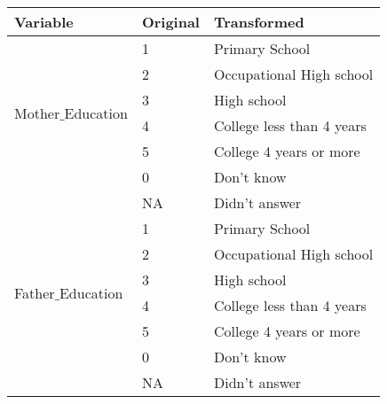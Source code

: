 \begin{table}[H]

	\tiny

	\centering

    \label{table:parents_education_transformation}
    
	\renewcommand{\arraystretch}{1.5}

    \begin{tabular}{l | l | l}
		\hline
        \rowcolor[HTML]{FF9999}		
		
        \textbf{Variable} & \textbf{Original} & \textbf{Transformed} \\ 		
        
        \hline 
                                    
            \multirow{6}{*}{Mother$\_$Education}
            					& \multicolumn{1}{l}{1}     & \multicolumn{1}{l}{Primary School}     \\\cline{2-3}
            					& \multicolumn{1}{l}{2}     & \multicolumn{1}{l}{Occupational High school}     \\\cline{2-3}
            					& \multicolumn{1}{l}{3}     & \multicolumn{1}{l}{High school}     \\\cline{2-3}            		
                                & \multicolumn{1}{l}{4}     & \multicolumn{1}{l}{College less than 4 years} \\\cline{2-3}
                                & \multicolumn{1}{l}{5}     & \multicolumn{1}{l}{College 4 years or more}     \\\cline{2-3}
                                & \multicolumn{1}{l}{0}     & \multicolumn{1}{l}{Don't know}     \\\cline{2-3}                                
                                & \multicolumn{1}{l}{NA}    & \multicolumn{1}{l}{Didn't answer}   \\\hline
                                    
            \multirow{6}{*}{Father$\_$Education}
            					& \multicolumn{1}{l}{1}     & \multicolumn{1}{l}{Primary School}     \\\cline{2-3}
            					& \multicolumn{1}{l}{2}     & \multicolumn{1}{l}{Occupational High school}     \\\cline{2-3}
            					& \multicolumn{1}{l}{3}     & \multicolumn{1}{l}{High school}     \\\cline{2-3}            		
                                & \multicolumn{1}{l}{4}     & \multicolumn{1}{l}{College less than 4 years} \\\cline{2-3}
                                & \multicolumn{1}{l}{5}     & \multicolumn{1}{l}{College 4 years or more}     \\\cline{2-3}
                                & \multicolumn{1}{l}{0}     & \multicolumn{1}{l}{Don't know}     \\\cline{2-3}                                
                                & \multicolumn{1}{l}{NA}    & \multicolumn{1}{l}{Didn't answer}   \\\hline


\end{tabular}
\end{table}
